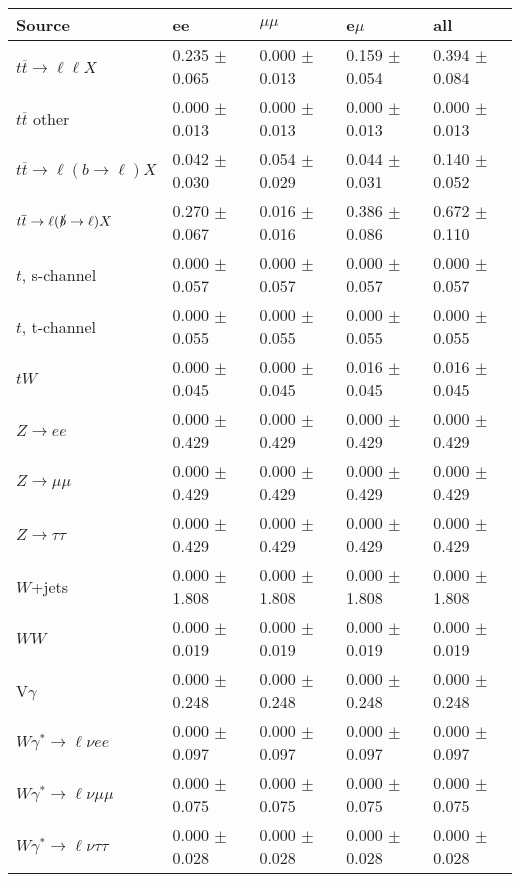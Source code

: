 \begin{tabular}{l | l l l l}
\hline\hline
 Source  &  ee  &  $\mu\mu$  &  e$\mu$  &  all \\
\hline
$t\overline{t}\rightarrow \ell\ell X$ &  0.235 $\pm$  0.065 &  0.000 $\pm$  0.013 &  0.159 $\pm$  0.054 &  0.394 $\pm$  0.084\\
$t\overline{t}$ other &  0.000 $\pm$  0.013 &  0.000 $\pm$  0.013 &  0.000 $\pm$  0.013 &  0.000 $\pm$  0.013\\
$t\overline{t}\rightarrow \ell(b\rightarrow \ell)X$ &  0.042 $\pm$  0.030 &  0.054 $\pm$  0.029 &  0.044 $\pm$  0.031 &  0.140 $\pm$  0.052\\
$t\overline{t}\rightarrow \ell(\slashed{b}\rightarrow \ell)X$ &  0.270 $\pm$  0.067 &  0.016 $\pm$  0.016 &  0.386 $\pm$  0.086 &  0.672 $\pm$  0.110\\
\hline
$t$, s-channel &  0.000 $\pm$  0.057 &  0.000 $\pm$  0.057 &  0.000 $\pm$  0.057 &  0.000 $\pm$  0.057\\
$t$, t-channel &  0.000 $\pm$  0.055 &  0.000 $\pm$  0.055 &  0.000 $\pm$  0.055 &  0.000 $\pm$  0.055\\
$tW$ &  0.000 $\pm$  0.045 &  0.000 $\pm$  0.045 &  0.016 $\pm$  0.045 &  0.016 $\pm$  0.045\\
\hline
$Z\rightarrow ee$ &  0.000 $\pm$  0.429 &  0.000 $\pm$  0.429 &  0.000 $\pm$  0.429 &  0.000 $\pm$  0.429\\
$Z\rightarrow\mu\mu$ &  0.000 $\pm$  0.429 &  0.000 $\pm$  0.429 &  0.000 $\pm$  0.429 &  0.000 $\pm$  0.429\\
$Z\rightarrow\tau\tau$ &  0.000 $\pm$  0.429 &  0.000 $\pm$  0.429 &  0.000 $\pm$  0.429 &  0.000 $\pm$  0.429\\
$W$+jets &  0.000 $\pm$  1.808 &  0.000 $\pm$  1.808 &  0.000 $\pm$  1.808 &  0.000 $\pm$  1.808\\
$WW$ &  0.000 $\pm$  0.019 &  0.000 $\pm$  0.019 &  0.000 $\pm$  0.019 &  0.000 $\pm$  0.019\\
\hline
V$\gamma$ &  0.000 $\pm$  0.248 &  0.000 $\pm$  0.248 &  0.000 $\pm$  0.248 &  0.000 $\pm$  0.248\\
$W\gamma^{*}\rightarrow\ell\nu e e$ &  0.000 $\pm$  0.097 &  0.000 $\pm$  0.097 &  0.000 $\pm$  0.097 &  0.000 $\pm$  0.097\\
$W\gamma^{*}\rightarrow\ell\nu\mu\mu$ &  0.000 $\pm$  0.075 &  0.000 $\pm$  0.075 &  0.000 $\pm$  0.075 &  0.000 $\pm$  0.075\\
$W\gamma^{*}\rightarrow\ell\nu\tau\tau$ &  0.000 $\pm$  0.028 &  0.000 $\pm$  0.028 &  0.000 $\pm$  0.028 &  0.000 $\pm$  0.028\\

\end{tabular}
